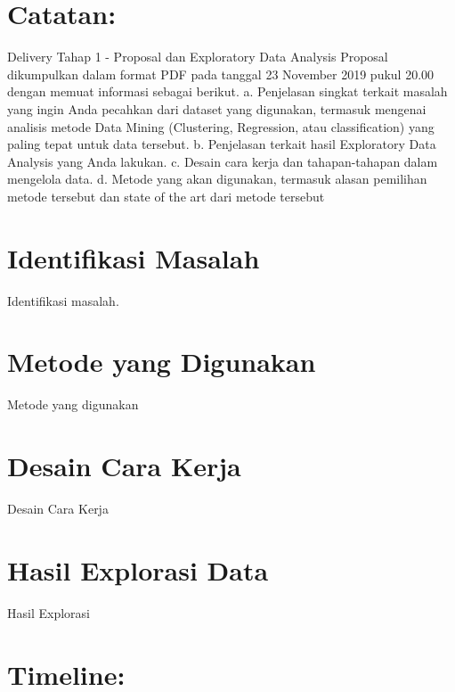 \documentclass{article}
\begin{document}
    \begin{normalsize}
    
        \section{Catatan:}
        
        Delivery Tahap 1 - Proposal dan Exploratory Data Analysis
        Proposal dikumpulkan dalam format PDF pada tanggal 23 November 2019 pukul 20.00
        dengan memuat informasi sebagai berikut.
        a. Penjelasan singkat terkait masalah yang ingin Anda pecahkan dari dataset yang
        digunakan, termasuk mengenai analisis metode Data Mining (Clustering,
        Regression, atau classification) yang paling tepat untuk data tersebut.
        b. Penjelasan terkait hasil Exploratory Data Analysis yang Anda lakukan.
        c. Desain cara kerja dan tahapan-tahapan dalam mengelola data.
        d. Metode yang akan digunakan, termasuk alasan pemilihan metode tersebut dan
        state of the art dari metode tersebut
        
        \section{Identifikasi Masalah}
        
        Identifikasi masalah.
        
        \section{Metode yang Digunakan}

        Metode yang digunakan

        \section{Desain Cara Kerja}

        Desain Cara Kerja

	   	\section{Hasil Explorasi Data}
        
        Hasil Explorasi
        
    	\section{Timeline:}
        

\end{normalsize}
\end{document}
